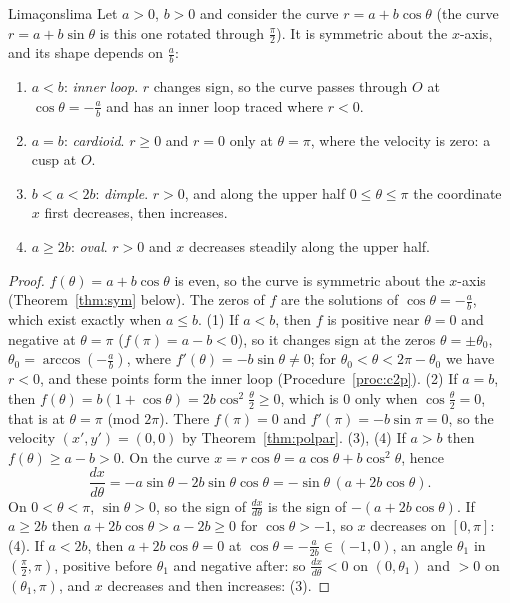 \documentclass[11pt]{article}
\begin{document}
\begin{thm}{Limaçons}{lima}
Let $a>0$, $b>0$ and consider the curve $r=a+b\cos\theta$ (the curve $r=a+b\sin\theta$ is this one rotated through $\frac\pi2$). It is symmetric about the $x$-axis, and its shape depends on $\frac ab$:
\begin{enumerate}[nosep]
  \item $a<b$: \emph{inner loop}. $r$ changes sign, so the curve passes through $O$ at $\cos\theta=-\frac ab$ and has an inner loop traced where $r<0$.
  \item $a=b$: \emph{cardioid}. $r\ge0$ and $r=0$ only at $\theta=\pi$, where the velocity is zero: a cusp at $O$.
  \item $b<a<2b$: \emph{dimple}. $r>0$, and along the upper half $0\le\theta\le\pi$ the coordinate $x$ first decreases, then increases.
  \item $a\ge2b$: \emph{oval}. $r>0$ and $x$ decreases steadily along the upper half.
\end{enumerate}
\end{thm}
\begin{proof}
$f(\theta)=a+b\cos\theta$ is even, so the curve is symmetric about the $x$-axis (Theorem~\ref{thm:sym} below). The zeros of $f$ are the solutions of $\cos\theta=-\frac ab$, which exist exactly when $a\le b$.
(1) If $a<b$, then $f$ is positive near $\theta=0$ and negative at $\theta=\pi$ ($f(\pi)=a-b<0$), so it changes sign at the zeros $\theta=\pm\theta_0$, $\theta_0=\arccos\left(-\frac ab\right)$, where $f'(\theta)=-b\sin\theta\ne0$; for $\theta_0<\theta<2\pi-\theta_0$ we have $r<0$, and these points form the inner loop (Procedure~\ref{proc:c2p}).
(2) If $a=b$, then $f(\theta)=b(1+\cos\theta)=2b\cos^2\frac\theta2\ge0$, which is $0$ only when $\cos\frac\theta2=0$, that is at $\theta=\pi$ (mod $2\pi$). There $f(\pi)=0$ and $f'(\pi)=-b\sin\pi=0$, so the velocity $(x',y')=(0,0)$ by Theorem~\ref{thm:polpar}.
(3), (4) If $a>b$ then $f(\theta)\ge a-b>0$. On the curve $x=r\cos\theta=a\cos\theta+b\cos^2\theta$, hence
\[
\frac{dx}{d\theta}=-a\sin\theta-2b\sin\theta\cos\theta=-\sin\theta\,(a+2b\cos\theta).
\]
On $0<\theta<\pi$, $\sin\theta>0$, so the sign of $\frac{dx}{d\theta}$ is the sign of $-(a+2b\cos\theta)$. If $a\ge2b$ then $a+2b\cos\theta>a-2b\ge0$ for $\cos\theta>-1$, so $x$ decreases on $[0,\pi]$: (4). If $a<2b$, then $a+2b\cos\theta=0$ at $\cos\theta=-\frac a{2b}\in(-1,0)$, an angle $\theta_1$ in $\left(\frac\pi2,\pi\right)$, positive before $\theta_1$ and negative after: so $\frac{dx}{d\theta}<0$ on $(0,\theta_1)$ and $>0$ on $(\theta_1,\pi)$, and $x$ decreases and then increases: (3).
\end{proof}
\end{document}
